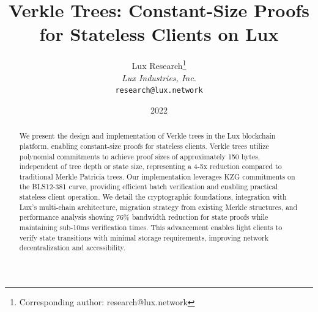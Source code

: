 \documentclass[11pt,a4paper]{article}
\title{\textbf{Verkle Trees: Constant-Size Proofs for Stateless Clients on Lux}}
\author{
Lux Research\thanks{Corresponding author: research@lux.network}\\
\textit{Lux Industries, Inc.}\\
\texttt{research@lux.network}
}
\date{2022}
\theoremstyle{definition}
\begin{document}
\luxcoverpage

\begin{abstract}
We present the design and implementation of Verkle trees in the Lux blockchain platform, enabling constant-size proofs for stateless clients. Verkle trees utilize polynomial commitments to achieve proof sizes of approximately 150 bytes, independent of tree depth or state size, representing a 4-5x reduction compared to traditional Merkle Patricia trees. Our implementation leverages KZG commitments on the BLS12-381 curve, providing efficient batch verification and enabling practical stateless client operation. We detail the cryptographic foundations, integration with Lux's multi-chain architecture, migration strategy from existing Merkle structures, and performance analysis showing 76\% bandwidth reduction for state proofs while maintaining sub-10ms verification times. This advancement enables light clients to verify state transitions with minimal storage requirements, improving network decentralization and accessibility.
\end{abstract}

















\end{document}

